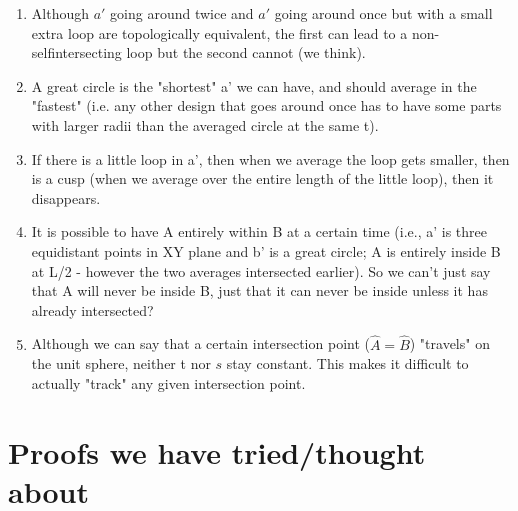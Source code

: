 \documentclass[12pt]{article}
\begin{document}
\begin{enumerate}
\item Although $a'$ going around twice and $a'$ going around once but with a small extra loop are topologically equivalent, the first can lead to a non-selfintersecting loop but the second cannot (we think).

\pagebreak

\item A great circle is the "shortest" a' we can have, and should average in the "fastest" (i.e. any other design that goes around once has to have some parts with larger radii than the averaged circle at the same t).

\item If there is a little loop in a', then when we average the loop gets smaller, then is a cusp (when we average over the entire length of the little loop), then it disappears.


\item It is possible to have A entirely within B at a certain time (i.e., a' is three equidistant points in XY plane and b' is a great circle; A is entirely inside B at L/2 - however the two averages intersected earlier). So we can't just say that A will never be inside B, just that it can never be inside unless it has already intersected?
\item Although we can say that a certain intersection point ($\hat{A} = \hat{B}$) "travels" on the unit sphere, neither t nor $s$ stay constant. This makes it difficult to actually "track" any given intersection point.

\end{enumerate}

\section{Proofs we have tried/thought about}
\end{document}
